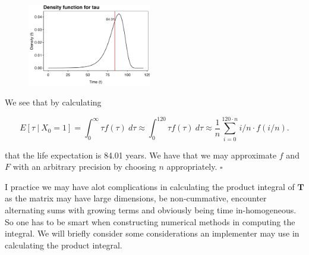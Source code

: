 \documentclass[a4paper,12pt,openany]{book}
\begin{document}
\begin{figure}[H]
  \begin{center}
    \includegraphics[width=0.48\textwidth]{figures/ex1_PT_dist.png}
  \end{center}
\end{figure}

We see that by calculating

\[
E[\tau\ \vert\ X_0=1]=\int_0^\infty \tau f(\tau)\ d\tau\approx\int_0^{120}\tau f(\tau)\ d\tau\approx\frac{1}{n}\sum_{i=0}^{120\cdot n} i/n\cdot f(i/n).
\]

that the life expectation is 84.01 years. We have that we may approximate \(f\) and \(F\) with an arbitrary precision by choosing \(n\) appropriately. \(\square\)

I practice we may have alot complications in calculating the product integral of \(\mathbf T\) as the matrix may have large dimensions, be non-cummative, encounter alternating sums with growing terms and obviously being time in-homogeneous. So one has to be smart when constructing numerical methods in computing the integral. We will briefly consider some considerations an implementer may use in calculating the product integral.
\end{document}

